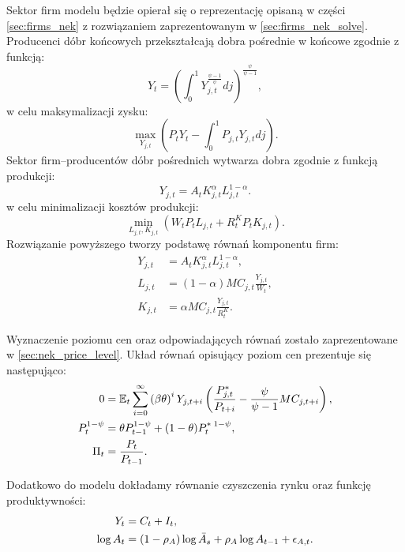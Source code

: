 Sektor firm modelu będzie opierał się o reprezentację opisaną w części \ref{sec:firms_nek} z rozwiązaniem zaprezentowanym w \ref{sec:firms_nek_solve}. Producenci dóbr końcowych przekształcają dobra pośrednie w końcowe zgodnie z funkcją:
\begin{equation}
    Y_t = (\int_0^1 Y_{j,t}^{\frac{\psi-1}{\psi}}dj)^{\frac{\psi}{\psi-1}},
\end{equation}
w celu maksymalizacji zysku:
\begin{equation}
    \max_{Y_{j,t}} \left(P_t Y_t - \int_0^1P_{j,t}Y_{j,t} dj\right).
\end{equation}
Sektor firm--producentów dóbr pośrednich wytwarza dobra zgodnie z funkcją produkcji:
\begin{equation}
    Y_{j,t} = A_t K_{j,t}^\alpha L_{j,t}^{1-\alpha}.
\end{equation}
w celu minimalizacji kosztów produkcji:
\begin{equation}
    \min_{L_{j,t},K_{j,t}} \left(W_t P_t L_{j,t} + R^K_t P_t K_{j,t}\right).
\end{equation}
Rozwiązanie powyższego tworzy podstawę równań komponentu firm:
\begin{align}
    Y_{j,t} &= A_t K_{j,t}^\alpha L_{j,t}^{1-\alpha}, \\
    L_{j,t} &= (1-\alpha) MC_{j,t} \frac{Y_{j,t}}{W_t},\\
    K_{j,t} &= \alpha MC_{j,t} \frac{Y_{j,t}}{R^K_t}.
\end{align}

Wyznaczenie poziomu cen oraz odpowiadających równań zostało zaprezentowane w \ref{sec:nek_price_level}. Układ równań opisujący poziom cen prezentuje się następująco:
\begin{align}
    0 &= \mathbb{E}_t \sum_{i=0}^{\infty}\left( \beta \theta \right)^i Y_{j,t+i} \left( \frac{P^*_{j,t}}{P_{t+i}} - \frac{\psi}{\psi - 1} MC_{j,t+i}\right), \\
    P_t^{1-\psi} &= \theta P_{t-1}^{1-\psi} + (1-\theta) P_{t}^{*\;1-\psi}, \\ 
    \Pi_t &= \frac{P_t}{P_{t-1}}.
\end{align}

Dodatkowo do modelu dokładamy równanie czyszczenia rynku oraz funkcję produktywności:
\begin{align}
    Y_t &= C_t + I_t, \\
    \log{A_t} &= (1-\rho_A)\log{\bar{A}_s} + \rho_A \log{A_{t-1}} + \epsilon_{A,t}.
\end{align}


